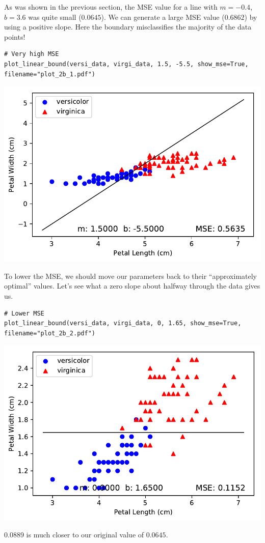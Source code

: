 \documentclass[letterpaper]{article}
\begin{document}
As was shown in the previous section, the MSE value for a line with $m=-0.4$, $b=3.6$ was
quite small ($0.0645$). We can generate a large MSE value ($0.6862$) by using a positive
slope. Here the boundary misclassifies the majority of the data points!
\begin{verbatim}
# Very high MSE
plot_linear_bound(versi_data, virgi_data, 1.5, -5.5, show_mse=True, filename="plot_2b_1.pdf")
\end{verbatim}
\begin{center}
\includegraphics{plot_2b_1.pdf}
\end{center}
To lower the MSE, we should move our parameters back to their ``approximately optimal''
values. Let's see what a zero slope about halfway through the data gives us.
\begin{verbatim}
# Lower MSE
plot_linear_bound(versi_data, virgi_data, 0, 1.65, show_mse=True, filename="plot_2b_2.pdf")
\end{verbatim}
\begin{center}
\includegraphics{plot_2b_2.pdf}
\end{center}
$0.0889$ is much closer to our original value of $0.0645$.
\end{document}
